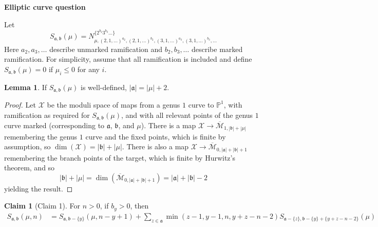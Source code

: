 \documentclass[11pt]{article}           %
\newcommand{\thishw}{\bf Elliptic curve question}
\theoremstyle{definition}
\newtheorem*{claim}{Claim}
\theoremstyle{definition}
\newtheorem*{lem}{Lemma}
\begin{document}
\centerline{\LARGE\thishw}


Let
\[
S_{\mathfrak a,\mathfrak b}(\mu)=N_{\mu,(2,1,\dots)^{a_2},(2,1,\dots)^{b_2},(3,1,\dots)^{a_3},(3,1,\dots)^{b_3},\dots}^{\{2^{b_2}3^{b_3}\dots\}}
\]
Here $a_2,a_3,\dots$ describe unmarked ramification and $b_2,b_3,\dots$ describe marked ramification. For
simplicity, assume that all ramification is included and define $S_{\mathfrak a,\mathfrak b}(\mu)= 0$ if $\mu_i\leq 0$ for any $i$.

\begin{lem}
  If $S_{\mathfrak a,\mathfrak b}(\mu)$ is well-defined, $|\mathfrak a|=|\mu|+2$.
\end{lem}
\begin{proof}
  Let $\mathcal X$ be the moduli space of maps from a genus $1$ curve to $\mathbb P^1$, with ramification as required for $S_{\mathfrak a,\mathfrak b}(\mu)$, and with all relevant points of the genus $1$ curve marked
  (corresponding to $\mathfrak a$, $\mathfrak b$, and $\mu$). There is a map $\mathcal X\to\overline{\mathcal M}_{1,|\mathfrak b|+|\mu|}$ remembering the genus $1$ curve and the fixed points, which is finite by assumption, so $\dim(\mathcal X)=|\mathfrak b|+|\mu|$. There is also a map $\mathcal X\to\overline{\mathcal M}_{0,|\mathfrak a|+|\mathfrak b|+1}$ remembering the branch points of the target, which is finite by Hurwitz's theorem, and so
  \[
  |\mathfrak b|+|\mu|=\dim(\overline{\mathcal M}_{0,|\mathfrak a|+|\mathfrak b|+1})=|\mathfrak a|+|\mathfrak b|-2
  \]
  yielding the result.
\end{proof}

\begin{claim}[Claim 1]
  For $n>0$, if $b_y>0$, then
  \begin{align*}
    S_{\mathfrak a,\mathfrak b}(\mu, n) &=S_{\mathfrak a,\mathfrak b-\{y\}}(\mu, n-y+1) +\sum_{z\in\mathfrak a}\min(z-1,y-1,n,y+z-n-2)S_{\mathfrak a-\{z\},\mathfrak b-\{y\}+\{y+z-n-2\}}(\mu)
  \end{align*}
\end{claim}
\end{document}
